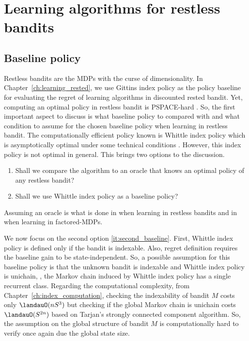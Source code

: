 \section{Learning algorithms for restless bandits}
\label{ch:restless:sec:generic}

\subsection{Baseline policy}

Restless bandits are the MDPs with the curse of dimensionality.
In Chapter~\ref{ch:learning_rested}, we use Gittins index policy as the policy baseline for evaluating the regret of learning algorithms in discounted rested bandit.
Yet, computing an optimal policy in restless bandit is PSPACE-hard \cite{papadimitriou1994complexity}.
So, the first important aspect to discuss is what baseline policy to compared with and what condition to assume for the chosen baseline policy when learning in restless bandit.
The computationally efficient policy known is Whittle index policy which is asymptotically optimal under some technical conditions \cite{weber1990index}.
However, this index policy is not optimal in general.
This brings two options to the discussion.
\begin{enumerate}[label=(\roman*)]
    \item Shall we compare the algorithm to an oracle that knows an optimal policy of any restless bandit?
    \item \label{it:second_baseline} Shall we use Whittle index policy as a baseline policy?
\end{enumerate}

Assuming an oracle is what is done in \cite{ortner2012regret, jung2019thompson, wang2020restless} when learning in restless bandits and in \cite{osband2014near, rosenberg2020oracle, xu2020reinforcement} when learning in factored-MDPs.

We now focus on the second option \ref{it:second_baseline}.
First, Whittle index policy is defined only if the bandit is indexable.
Also, regret definition requires the baseline gain to be state-independent.
So, a possible assumption for this baseline policy is that the unknown bandit is indexable and Whittle index policy is unichain, \ie, the Markov chain induced by Whittle index policy has a single recurrent class.
Regarding the computational complexity, from Chapter~\ref{ch:index_computation}, checking the indexability of bandit $M$ costs only $\landauO(nS^3)$ but checking if the global Markov chain is unichain costs $\landauO(S^{2n})$ based on Tarjan's strongly connected component algorithm.
So, the assumption on the global structure of bandit $M$ is computationally hard to verify once again due the global state size.

